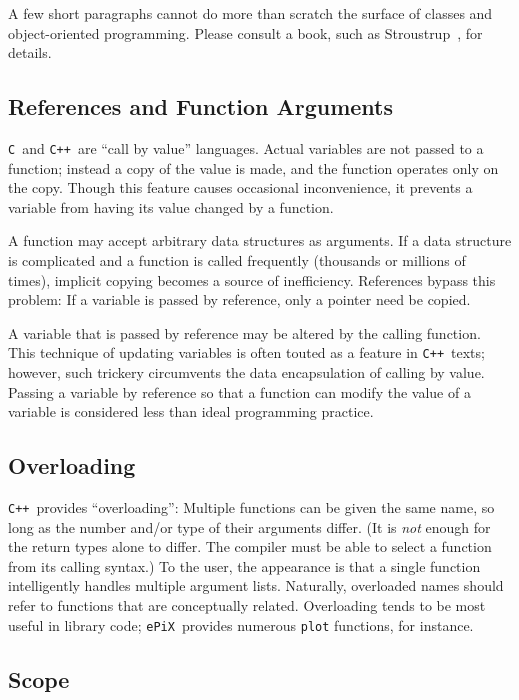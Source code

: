 \documentclass[12pt]{report}
\newcommand{\code}[1]{\texttt{#1}}
\newcommand{\ePiX}{\code{ePiX}}
\newcommand{\CXX}{\code{C++}}
\begin{document}
A few short paragraphs cannot do more than scratch the surface of
classes and object-oriented programming. Please consult a book, such
as Stroustrup~\cite{S}, for details.


\subsection*{References and Function Arguments}

\code{C}~and \CXX\ are ``call by value'' languages. Actual variables
are not passed to a function; instead a copy of the value is made, and
the function operates only on the copy. Though this feature causes
occasional inconvenience, it prevents a variable from having its value
changed by a function.

A function may accept arbitrary data structures as arguments. If a
data structure is complicated and a function is called frequently
(thousands or millions of times), implicit copying becomes a source of
inefficiency. References bypass this problem: If a variable is passed
by reference, only a pointer need be copied. 

A variable that is passed by reference may be altered by the calling
function. This technique of updating variables is often touted as a
feature in \CXX\ texts; however, such trickery circumvents the data
encapsulation of calling by value. Passing a variable by reference so
that a function can modify the value of a variable is considered less
than ideal programming practice.


\subsection*{Overloading}

\CXX\ provides ``overloading'': Multiple functions can be given the
same name, so long as the number and/or type of their arguments
differ. (It is \emph{not} enough for the return types alone to differ.
The compiler must be able to select a function from its calling
syntax.)  To the user, the appearance is that a single function
intelligently handles multiple argument lists. Naturally, overloaded
names should refer to functions that are conceptually related.
Overloading tends to be most useful in library code; \ePiX\ provides
numerous \code{plot} functions, for instance.


\subsection*{Scope}
\end{document}
